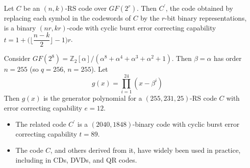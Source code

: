 \begin{Theorem}{}{}
    Let $ C $ be an $ (n,k) $-RS code over $ GF(2^r) $. Then
    $ C^{\prime} $, the code obtained by replacing each symbol
    in the codewords of $ C $ by the $ r $-bit binary representations,
    is a binary $ (nr,kr) $-code with cyclic burst error
    correcting capability $ t=1+\biggl(\biggl\lfloor \dfrac{n-k}{2} \biggr\rfloor-1\biggr)r $.
\end{Theorem}

\begin{Example}{}{}
    Consider $ GF(2^8)=\mathbb{Z}_2[\alpha]/(\alpha^8+\alpha^4+\alpha^3+\alpha^2+1) $.
    Then $ \beta=\alpha $ has order $ n=255 $ (so $ q=256 $, $ n=255 $).
    Let
    \[ g(x)=\prod_{i=1}^{24}(x-\beta^i) \]
    Then $ g(x) $ is the generator polynomial for a $ (255,231,25) $-RS
    code $ C $ with error correcting capability $ e=12 $.

    \begin{itemize}
        \item The related code $ C^{\prime} $ is a $ (2040,1848) $-binary code with
              cyclic burst error correcting capability $ t=89 $.
        \item The code $ C $, and others derived from it, have widely been used in practice,
              including in CDs, DVDs, and QR codes.
    \end{itemize}
\end{Example}
